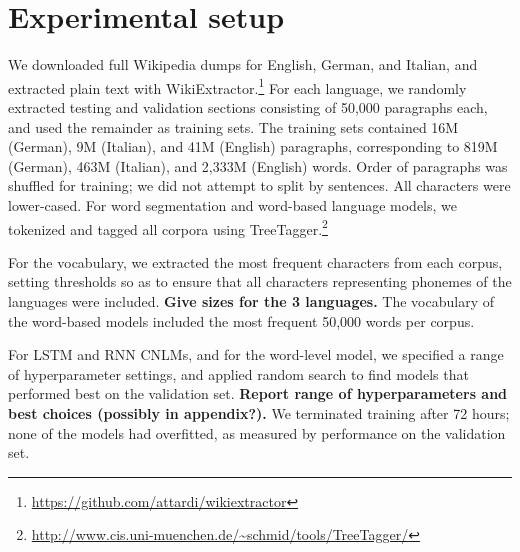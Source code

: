 \section{Experimental setup}
\label{sec:setup}

We downloaded full Wikipedia dumps for English, German, and Italian, and extracted plain text with WikiExtractor.\footnote{\url{https://github.com/attardi/wikiextractor}}
For each language, we randomly extracted testing and validation sections consisting of 50,000 paragraphs each, and used the remainder as training sets.
The training sets contained 16M (German), 9M (Italian), and 41M (English) paragraphs, corresponding to 819M (German), 463M (Italian), and 2,333M (English) words.
Order of paragraphs was shuffled for training; we did not attempt to split by sentences.
All characters were lower-cased.
For word segmentation and word-based language models, we tokenized and tagged all corpora using TreeTagger.\footnote{\url{http://www.cis.uni-muenchen.de/~schmid/tools/TreeTagger/}}

For the vocabulary, we extracted the most frequent characters from
each corpus, setting thresholds so as to ensure that all characters
representing phonemes of the languages were included. \textbf{Give
  sizes for the 3 languages.}  The vocabulary of the word-based models
included the most frequent 50,000 words per corpus.


For LSTM and RNN CNLMs, and for the word-level model, we specified a range of hyperparameter settings, and applied random search to find models that performed best on the validation set. \textbf{Report range of hyperparameters and best choices (possibly in appendix?).}
We terminated training after 72 hours; none of the models had overfitted, as measured by performance on the validation set.

